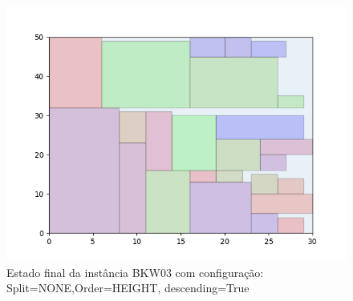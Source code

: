 \begin{figure}[H]
    \centering
    \caption[]{Estado final da instância BKW03 com configuração: Split=NONE,Order=HEIGHT, descending=True}
    \label{fig:bkw03-none-height-true}
    \includegraphics[scale=0.5]{output/figures/bkw/bkw03/none/height/true/00}
\end{figure}